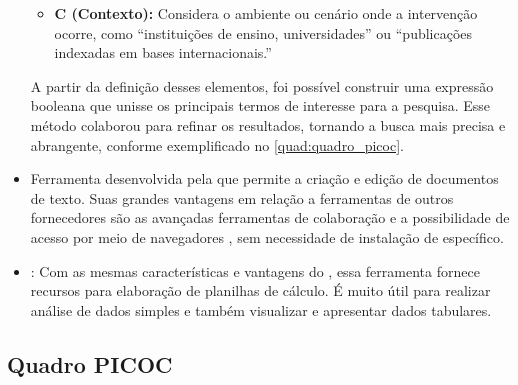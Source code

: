 \begin{itemize}
\begin{itemize}
    \item \textbf{C (Contexto):} Considera o ambiente ou cenário onde a intervenção ocorre, como “instituições de ensino, universidades” ou “publicações indexadas em bases internacionais.”
\end{itemize}
A partir da definição desses elementos, foi possível construir uma expressão booleana que unisse os principais termos de interesse para a pesquisa. Esse método colaborou para refinar os resultados, tornando a busca mais precisa e abrangente, conforme exemplificado no \autoref{quad:quadro_picoc}.
    \item \textbf{} Ferramenta desenvolvida pela  que permite a criação e edição de documentos de texto. Suas grandes vantagens em relação a ferramentas de outros fornecedores são as avançadas ferramentas de colaboração e a possibilidade de acesso por meio de navegadores , sem necessidade de instalação de  específico.
    \item \textbf{}: Com as mesmas características e vantagens do , essa ferramenta fornece recursos para elaboração de planilhas de cálculo. É muito útil para realizar análise de dados simples e também visualizar e apresentar dados tabulares.
\end{itemize}





\subsection{Quadro PICOC}
\label{section:quadro_picoc}

